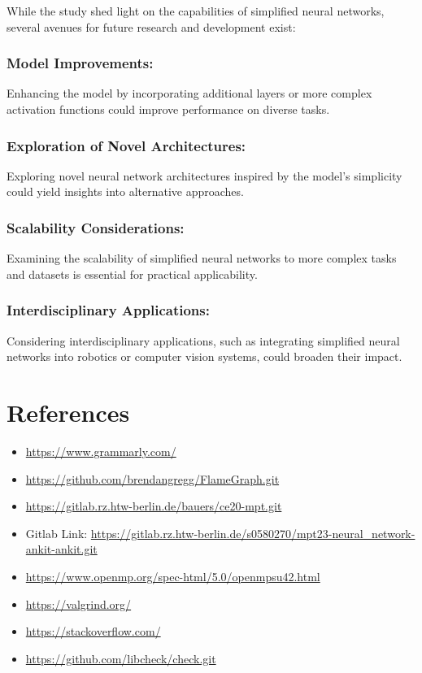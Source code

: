 \documentclass{article}
\begin{document}
While the study shed light on the capabilities of simplified neural networks, several avenues for future research and development exist:

\subsubsection*{Model Improvements:}
Enhancing the model by incorporating additional layers or more complex activation functions could improve performance on diverse tasks.

\subsubsection*{Exploration of Novel Architectures:}
Exploring novel neural network architectures inspired by the model's simplicity could yield insights into alternative approaches.

\subsubsection*{Scalability Considerations:}
Examining the scalability of simplified neural networks to more complex tasks and datasets is essential for practical applicability.

\subsubsection*{Interdisciplinary Applications:}
Considering interdisciplinary applications, such as integrating simplified neural networks into robotics or computer vision systems, could broaden their impact.

\section{References}

\begin{itemize}
  \item \url{https://www.grammarly.com/}
  \item \url{https://github.com/brendangregg/FlameGraph.git}
  \item \url{https://gitlab.rz.htw-berlin.de/bauers/ce20-mpt.git}
  \item  Gitlab Link: \href{https://gitlab.rz.htw-berlin.de/s0580270/mpt23-neural_network-ankit-ankit.git}{\url{https://gitlab.rz.htw-berlin.de/s0580270/mpt23-neural_network-ankit-ankit.git}}
  \item \url{https://www.openmp.org/spec-html/5.0/openmpsu42.html}
  \item \url{https://valgrind.org/}
  \item \url{https://stackoverflow.com/}
  \item \url{https://github.com/libcheck/check.git}
\end{itemize}
 
\end{document}
